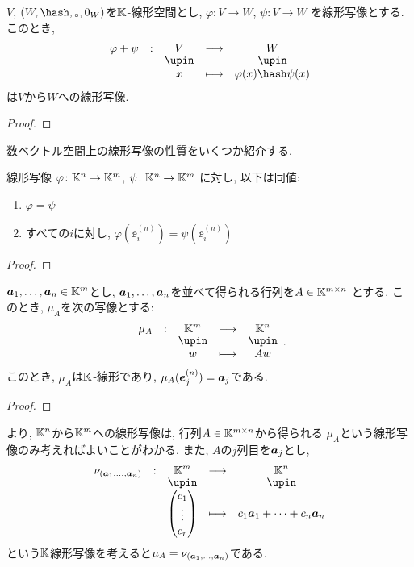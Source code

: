 \begin{example}
  $V$, $(W,\pplus,\aact,0_W)$を$\mathbb{K}$-線形空間とし,
  $\varphi\colon V\to W$,
  $\psi\colon V\to W$
  を線形写像とする.
  このとき, 
  \begin{align*}
  \shazo{\varphi+\psi}{V}{W}
  {x}{\varphi(x) \pplus \psi(x)}
  \end{align*}
  は$V$から$W$への線形写像.
\end{example}
\begin{proof}\end{proof}




数ベクトル空間上の線形写像の性質をいくつか紹介する.
\begin{prop}
\label{prop:linmap:kn:1}
線形写像
$\varphi\colon \mathbb{K}^n \to \mathbb{K}^m$,
$\psi\colon \mathbb{K}^n \to \mathbb{K}^m$
に対し, 以下は同値:
\begin{enumerate}
\item $\varphi=\psi$
\item すべての$i$に対し, $\varphi(\ee^{(n)}_i)=\psi(\ee^{(n)}_i)$
\end{enumerate}
\end{prop}
\begin{proof}\end{proof}

\begin{prop}
\label{prop:linmap:kn:2}
  $\boldsymbol{a}_1,\ldots, \boldsymbol{a}_n \in \mathbb{K}^m$とし,
  $\boldsymbol{a}_1,\ldots, \boldsymbol{a}_n $を並べて得られる行列を$A\in\mathbb{K}^{m\times n}$
  とする.
  このとき, $\mu_A$を次の写像とする:
  \begin{align*}
    \shazo{\mu_A}{\KK^m}{\KK^n}{w}{Aw}.
  \end{align*}
  このとき, $\mu_A$は$\mathbb{K}$-線形であり,
   $\mu_A(\boldsymbol{e}^{(n)}_j)=\boldsymbol{a}_j$である.
\end{prop}
\begin{proof}\end{proof}

\begin{remark}
より,
$\mathbb{K}^n$から$\mathbb{K}^m$への線形写像は,
行列$A\in\mathbb{K}^{m\times n}$から得られる
$\mu_A$という線形写像のみ考えればよいことがわかる.
また, $A$の$j$列目を$\boldsymbol{a}_j$とし,
\begin{align*}
\shazo{\nu_{(\aaa_1,\ldots,\aaa_n)}}{\KK^m}{\KK^n}
      {\begin{pmatrix}c_1\\\vdots\\c_r\end{pmatrix}}{c_1\aaa_1+\cdots+c_n\aaa_n}
\end{align*}
という$\mathbb{K}$線形写像を考えると$\mu_A=\nu_{(\boldsymbol{a}_1,\ldots,\boldsymbol{a}_n)}$である.
\end{remark}

